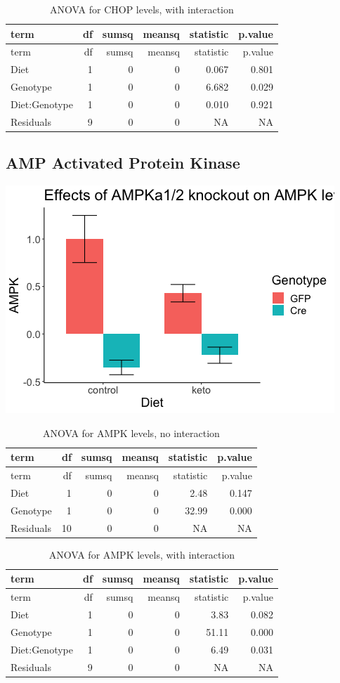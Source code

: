 \documentclass[
]{article}
\begin{document}
\begin{longtable}[]{@{}lrrrrr@{}}
\caption{ANOVA for CHOP levels, with interaction}\tabularnewline
\toprule
term & df & sumsq & meansq & statistic & p.value\tabularnewline
\midrule
\endfirsthead
\toprule
term & df & sumsq & meansq & statistic & p.value\tabularnewline
\midrule
\endhead
Diet & 1 & 0 & 0 & 0.067 & 0.801\tabularnewline
Genotype & 1 & 0 & 0 & 6.682 & 0.029\tabularnewline
Diet:Genotype & 1 & 0 & 0 & 0.010 & 0.921\tabularnewline
Residuals & 9 & 0 & 0 & NA & NA\tabularnewline
\bottomrule
\end{longtable}

\hypertarget{amp-activated-protein-kinase}{%
\subsection{AMP Activated Protein
Kinase}\label{amp-activated-protein-kinase}}

\includegraphics{figures/AMPK-barplot-1.png}

\begin{longtable}[]{@{}lrrrrr@{}}
\caption{ANOVA for AMPK levels, no interaction}\tabularnewline
\toprule
term & df & sumsq & meansq & statistic & p.value\tabularnewline
\midrule
\endfirsthead
\toprule
term & df & sumsq & meansq & statistic & p.value\tabularnewline
\midrule
\endhead
Diet & 1 & 0 & 0 & 2.48 & 0.147\tabularnewline
Genotype & 1 & 0 & 0 & 32.99 & 0.000\tabularnewline
Residuals & 10 & 0 & 0 & NA & NA\tabularnewline
\bottomrule
\end{longtable}

\begin{longtable}[]{@{}lrrrrr@{}}
\caption{ANOVA for AMPK levels, with interaction}\tabularnewline
\toprule
term & df & sumsq & meansq & statistic & p.value\tabularnewline
\midrule
\endfirsthead
\toprule
term & df & sumsq & meansq & statistic & p.value\tabularnewline
\midrule
\endhead
Diet & 1 & 0 & 0 & 3.83 & 0.082\tabularnewline
Genotype & 1 & 0 & 0 & 51.11 & 0.000\tabularnewline
Diet:Genotype & 1 & 0 & 0 & 6.49 & 0.031\tabularnewline
Residuals & 9 & 0 & 0 & NA & NA\tabularnewline
\bottomrule
\end{longtable}
\end{document}
